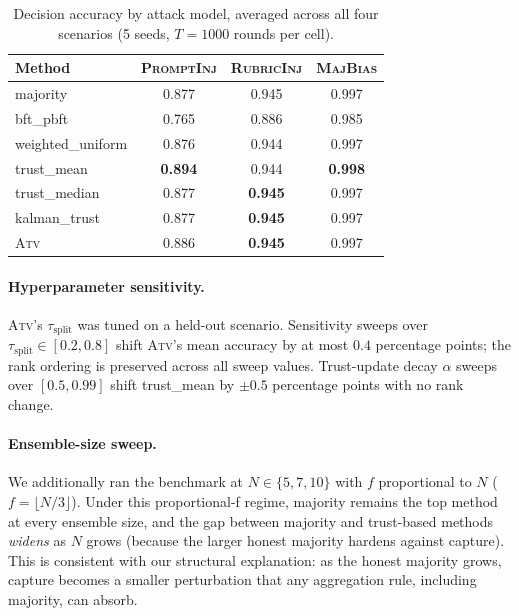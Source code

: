 \documentclass[11pt]{article}
\begin{document}
\begin{table}[ht]
\caption{Decision accuracy by attack model, averaged across all
four scenarios (5 seeds, $T=1000$ rounds per cell).}
\label{tab:per-attack}
\centering
\small
\begin{tabular}{lccc}
\toprule
Method & \textsc{PromptInj} & \textsc{RubricInj} & \textsc{MajBias} \\
\midrule
majority            & 0.877 & 0.945 & 0.997 \\
bft\_pbft           & 0.765 & 0.886 & 0.985 \\
weighted\_uniform   & 0.876 & 0.944 & 0.997 \\
trust\_mean         & \textbf{0.894} & 0.944 & \textbf{0.998} \\
trust\_median       & 0.877 & \textbf{0.945} & 0.997 \\
kalman\_trust       & 0.877 & \textbf{0.945} & 0.997 \\
\textsc{Atv}        & 0.886 & \textbf{0.945} & 0.997 \\
\bottomrule
\end{tabular}
\end{table}

\paragraph{Hyperparameter sensitivity.}
\textsc{Atv}'s $\tau_{\text{split}}$ was tuned on a held-out
scenario. Sensitivity sweeps over $\tau_{\text{split}} \in [0.2, 0.8]$
shift \textsc{Atv}'s mean accuracy by at most $0.4$ percentage
points; the rank ordering is preserved across all sweep values.
Trust-update decay $\alpha$ sweeps over $[0.5, 0.99]$ shift
trust\_mean by $\pm 0.5$ percentage points with no rank change.

\paragraph{Ensemble-size sweep.}
We additionally ran the benchmark at $N \in \{5, 7, 10\}$ with $f$
proportional to $N$ ($f = \lfloor N/3 \rfloor$). Under this
proportional-f regime, majority remains the top method at every
ensemble size, and the gap between majority and trust-based methods
\emph{widens} as $N$ grows (because the larger honest majority
hardens against capture). This is consistent with our structural
explanation: as the honest majority grows, capture becomes a
smaller perturbation that any aggregation rule, including
majority, can absorb.
\end{document}
